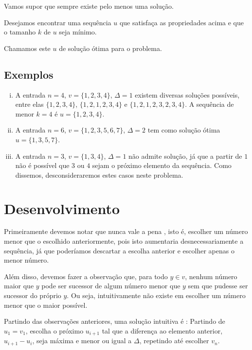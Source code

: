 Vamos supor que sempre existe pelo menos uma solução.

Desejamos encontrar uma sequência $u$ que satisfaça as propriedades acima e que o tamanho $k$ de $u$ seja mínimo.

Chamamos este $u$ de solução ótima para o problema.

\subsection*{Exemplos}

\begin{enumerate}[i)]
    \item A entrada $n = 4$, $v = \{1, 2, 3, 4\}$, $\Delta = 1$ existem diversas soluções possíveis, entre elas $\{1, 2, 3, 4\}$, $\{1, 2, 1, 2, 3, 4\}$ e $\{1, 2, 1, 2, 3, 2, 3, 4\}$. A sequência de menor $k = 4$ é $u = \{1, 2, 3, 4\}$.
    \item A entrada $n = 6$, $v = \{1, 2, 3, 5, 6, 7\}$, $\Delta = 2$ tem como solução ótima $u = \{1, 3, 5, 7\}$.
    \item A entrada $n = 3$, $v = \{1, 3, 4\}$, $\Delta = 1$ não admite solução, já que a partir de $1$ não é possível que $3$ ou $4$ sejam o próximo elemento da sequência. Como dissemos, desconsideraremos estes casos neste problema.
\end{enumerate}

\section{Desenvolvimento}

Primeiramente devemos notar que nunca vale a pena \textit{}, isto é, escolher um número menor que o escolhido anteriormente, pois isto aumentaria desnecessariamente a sequência, já que poderíamos descartar a escolha anterior e escolher apenas o menor número.

Além disso, devemos fazer a observação que, para todo $y \in v$, nenhum número maior que $y$ pode ser sucessor de algum número menor que $y$ sem que pudesse ser sucessor do próprio $y$. Ou seja, intuitivamente não existe \textit{} em escolher um número menor que o maior possível.

Partindo das observações anteriores, uma solução intuitiva é \textit{}: Partindo de $u_1 = v_1$, escolha o próximo $u_{i + 1}$ tal que a diferença ao elemento anterior, $u_{i + 1} - u_i$, seja máxima e menor ou igual a $\Delta$, repetindo até escolher $v_n$.

